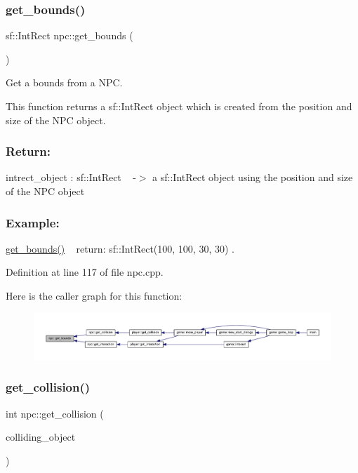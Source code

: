 \subsubsection{\texorpdfstring{get\+\_\+bounds()}{get\_bounds()}}
{\footnotesize\ttfamily sf\+::\+Int\+Rect npc\+::get\+\_\+bounds (\begin{DoxyParamCaption}{ }\end{DoxyParamCaption})}



Get a bounds from a N\+PC. 

This function returns a sf\+::\+Int\+Rect object which is created from the position and size of the N\+PC object.~\newline
 \subsubsection*{Return\+: }

intrect\+\_\+object \+: sf\+::\+Int\+Rect ~\newline
-\/$>$ a sf\+::\+Int\+Rect object using the position and size of the N\+PC object

\subsubsection*{Example\+: }

\hyperlink{classnpc_aa6a71f7355403e4a108f3c4e8b6a3931}{get\+\_\+bounds()} ~\newline
return\+: sf\+::\+Int\+Rect(100, 100, 30, 30) . 

Definition at line 117 of file npc.\+cpp.

Here is the caller graph for this function\+:
\nopagebreak
\begin{figure}[H]
\begin{center}
\leavevmode
\includegraphics[width=350pt]{classnpc_aa6a71f7355403e4a108f3c4e8b6a3931_icgraph}
\end{center}
\end{figure}
\mbox{\label{classnpc_a64342e70f2e8c3afde210ffa77e1e54e}} 
\subsubsection{\texorpdfstring{get\+\_\+collision()}{get\_collision()}}
{\footnotesize\ttfamily int npc\+::get\+\_\+collision (\begin{DoxyParamCaption}\item[{sf\+::\+Int\+Rect}]{colliding\+\_\+object }\end{DoxyParamCaption})}



